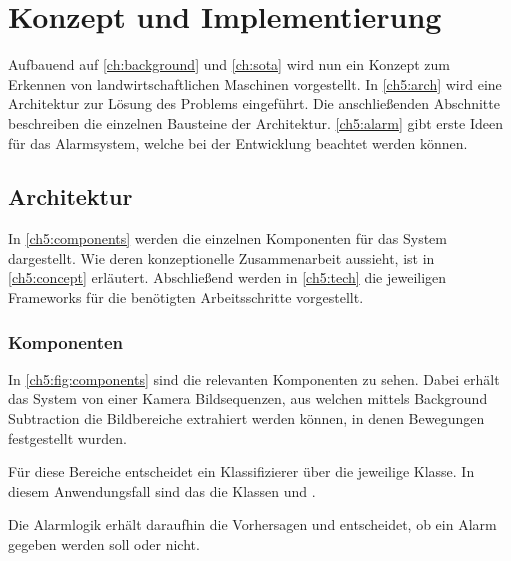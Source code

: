 \chapter{Konzept und Implementierung} \label{ch:concept}
Aufbauend auf \autoref{ch:background} und \autoref{ch:sota} wird nun ein Konzept zum Erkennen von landwirtschaftlichen Maschinen vorgestellt.
In \autoref{ch5:arch} wird eine Architektur zur Lösung des Problems eingeführt.
Die anschließenden Abschnitte beschreiben die einzelnen Bausteine der Architektur.
\autoref{ch5:alarm} gibt erste Ideen für das Alarmsystem, welche bei der Entwicklung beachtet werden können.


\section{Architektur}
\label{ch5:arch}

In \autoref{ch5:components} werden die einzelnen Komponenten für das System dargestellt.
Wie deren konzeptionelle Zusammenarbeit aussieht, ist in \autoref{ch5:concept} erläutert.
Abschließend werden in \autoref{ch5:tech} die jeweiligen Frameworks für die benötigten Arbeitsschritte vorgestellt.


\subsection{Komponenten} \label{ch5:components}
In \autoref{ch5:fig:components} sind die relevanten Komponenten zu sehen.
Dabei erhält das System von einer Kamera Bildsequenzen, aus welchen mittels Background Subtraction die Bildbereiche extrahiert werden können, in denen Bewegungen festgestellt wurden.

Für diese Bereiche entscheidet ein Klassifizierer über die jeweilige Klasse.
In diesem Anwendungsfall sind das die Klassen  und .

Die Alarmlogik erhält daraufhin die Vorhersagen und entscheidet, ob ein Alarm gegeben werden soll oder nicht.

